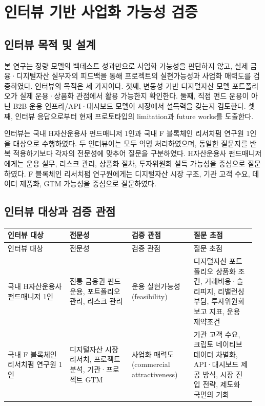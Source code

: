 \documentclass[12pt,a4paper]{article}
\begin{document}
\section{인터뷰 기반 사업화 가능성 검증}

\subsection{인터뷰 목적 및 설계}

본 연구는 정량 모델의 백테스트 성과만으로 사업화 가능성을 판단하지 않고, 실제 금융·디지털자산 실무자의 피드백을 통해 프로젝트의 실현가능성과 사업화 매력도를 검증하였다. 인터뷰의 목적은 세 가지이다. 첫째, 변동성 기반 디지털자산 모델 포트폴리오가 실제 운용·상품화 관점에서 활용 가능한지 확인한다. 둘째, 직접 펀드 운용이 아닌 B2B 운용 인프라/API·대시보드 모델이 시장에서 설득력을 갖는지 검토한다. 셋째, 인터뷰 응답으로부터 현재 프로토타입의 limitation과 future works를 도출한다.

인터뷰는 국내 H자산운용사 펀드매니저 1인과 국내 F 블록체인 리서치펌 연구원 1인을 대상으로 수행하였다. 두 인터뷰이는 모두 익명 처리하였으며, 동일한 질문지를 반복 적용하기보다 각자의 전문성에 맞추어 질문을 구분하였다. H자산운용사 펀드매니저에게는 운용 실무, 리스크 관리, 상품화 절차, 투자위원회 설득 가능성을 중심으로 질문하였다. F 블록체인 리서치펌 연구원에게는 디지털자산 시장 구조, 기관 고객 수요, 데이터 제품화, GTM 가능성을 중심으로 질문하였다.

\subsection{인터뷰 대상과 검증 관점}

\begin{center}
\small
\begin{longtable}{@{}p{0.24\linewidth}p{0.24\linewidth}p{0.24\linewidth}p{0.24\linewidth}@{}}
\toprule
인터뷰 대상 & 전문성 & 검증 관점 & 질문 초점 \\
\midrule
\endfirsthead
\toprule
인터뷰 대상 & 전문성 & 검증 관점 & 질문 초점 \\
\midrule
\endhead
국내 H자산운용사 펀드매니저 1인 & 전통 금융권 펀드 운용, 포트폴리오 관리, 리스크 관리 & 운용 실현가능성(feasibility) & 디지털자산 포트폴리오 상품화 조건, 거래비용·슬리피지, 리밸런싱 부담, 투자위원회 보고 지표, 운용 제약조건 \\
국내 F 블록체인 리서치펌 연구원 1인 & 디지털자산 시장 리서치, 프로젝트 분석, 기관·프로젝트 GTM & 사업화 매력도(commercial attractiveness) & 기관 고객 수요, 크립토 네이티브 데이터 차별화, API·대시보드 제공 방식, 시장 진입 전략, 제도화 국면의 기회 \\
\bottomrule
\end{longtable}
\end{center}
\end{document}

